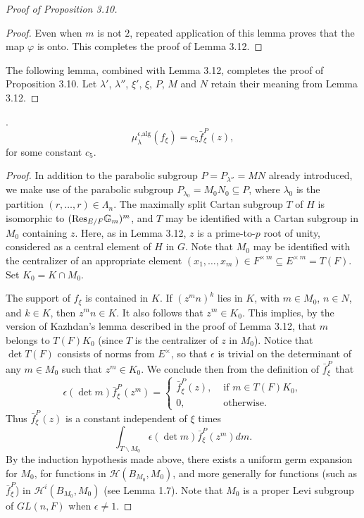 \documentclass{amsart}
\begin{document}
\begin{proof}[Proof of Proposition 3.10]
\begin{proof}
Even when $m$ is not $2$, repeated application of this lemma
proves that the map $\varphi$ is onto.  This completes the
proof of Lemma 3.12.
\end{proof}


The following lemma, combined with Lemma 3.12, completes the proof
of Proposition 3.10.  Let $\lambda'$, $\lambda''$, $\xi'$, $\xi$, $P$,
$M$ and $N$ retain their meaning from Lemma 3.12.\end{proof}

.  
$$\mu_\lambda^{\epsilon\text{,alg}}(f_\xi) = c_5 \bar f^P_\xi(z),$$
for some constant $c_5$.
\finishproclaim

\begin{proof}  In addition to the parabolic subgroup
$P=P_{\lambda''}=MN$ already introduced, we make use of the parabolic subgroup
$P_{\lambda_0}=M_0N_0\subseteq P$, where $\lambda_0$ is the
partition $(r,\ldots, r)\in \Lambda_n$.  The maximally split
Cartan subgroup $T$ of $H$ is isomorphic to $(\text{Res}_{E/F}{\Bbb G}_m)^m$,
and $T$ may be identified with a Cartan subgroup in $M_0$ containing $z$.
Here, as in Lemma 3.12, $z$ is a prime-to-$p$ root of unity, considered
as a central element of $H$ in $G$.  Note that $M_0$ may be identified
with the centralizer of an appropriate element 
$(x_1,\ldots,x_m)\in F^{\times\,m}\subseteq
E^{\times\,m} = T(F)$.  Set $K_0 = K\cap M_0$.

The support of $f_\xi$ is contained in $K$.  If $(z^mn)^k$ lies in $K$,
with $m\in M_0$, $n\in N$, and $k\in K$, then $z^mn\in K$.  It also follows
 that $z^m\in K_0$.  This implies, by the version of Kazhdan's lemma
 described in the proof of Lemma 3.12,
 that $m$ belongs to $T(F)K_0$ (since $T$ is the centralizer of $z$ in $M_0$).
 Notice that $\det T(F)$ consists of norms from $E^\times$, so that
 $\epsilon$ is trivial on the determinant of any $m\in M_0$ such that $z^m\in K_0$.
 We conclude then from the definition of $\bar f_\xi^P$ that
 $$\epsilon(\det m)\bar f_\xi^P(z^m) = 
  \begin{cases} 
	\bar f^P_\xi(z), & \text{ if }m\in T(F)K_0,\\
	0, & \text{ otherwise. }\end{cases}
	$$
Thus $\bar f_\xi^P(z)$ is a constant independent of $\xi$ times
$$\int_{T\backslash M_0} \epsilon(\det m) \bar f_\xi^P(z^m) dm.$$
By the induction hypothesis made above, there exists a
uniform germ expansion for $M_0$, for functions in ${\mathcal H}(B_{M_0},M_0)$,
and more generally for functions (such as $\bar f_\xi^P$) in ${\mathcal H}^i
(B_{M_0},M_0)$ (see Lemma 1.7).  
Note that $M_0$ is a proper Levi subgroup of
$GL(n,F)$ when $\epsilon\ne 1$.  


\end{proof}
\end{document}
